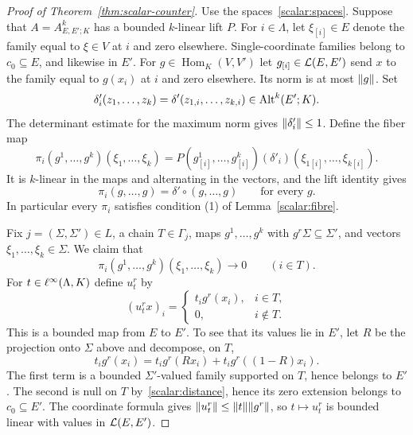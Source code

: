 \begin{proof}[Proof of Theorem~\ref{thm:scalar-counter}]
Use the spaces~\eqref{scalar:spaces}. Suppose that $A=A^k_{E,E';K}$ has a bounded $k$\nobreakdash-linear
lift $P$. For $i\in\Lambda$, let $\xi_{[i]}\in E$ denote the family equal to $\xi\in V$ at $i$ and zero
elsewhere. Single-coordinate families belong to $c_0\subseteq E$, and likewise in $E'$. For
$g\in\operatorname{Hom}_K(V,V')$ let $g_{[i]}\in\mathcal L(E,E')$ send $x$ to the family equal to $g(x_i)$ at
$i$ and zero elsewhere. Its norm is at most $\lVert g\rVert$. Set
\[
 \delta'_i(z_1,\dots,z_k)=\delta'(z_{1,i},\dots,z_{k,i})\in\operatorname{Alt}^k(E';K).
\]
The determinant estimate for the maximum norm gives $\lVert \delta'_i\rVert\le1$. Define the fiber map
\begin{equation}\label{scalar:fibre-map}
 \pi_i(g^1,\dots,g^k)(\xi_1,\dots,\xi_k)
 =P(g^1_{[i]},\dots,g^k_{[i]})(\delta'_i)
       (\xi_{1[i]},\dots,\xi_{k[i]}).
\end{equation}
It is $k$\nobreakdash-linear in the maps and alternating in the vectors, and the lift identity gives
\begin{equation}\label{scalar:fibre-diagonal}
 \pi_i(g,\dots,g)=\delta'\circ(g,\dots,g)
 \qquad\text{for every }g.
\end{equation}
In particular every $\pi_i$ satisfies condition (1) of Lemma~\ref{scalar:fibre}.

Fix $j=(\Sigma,\Sigma')\in L$, a chain $T\in\Gamma_j$, maps $g^1,\dots,g^k$ with
$g^r\Sigma\subseteq\Sigma'$, and vectors $\xi_1,\dots,\xi_k\in\Sigma$. We claim that
\begin{equation}\label{scalar:chain-decay}
 \pi_i(g^1,\dots,g^k)(\xi_1,\dots,\xi_k)\longrightarrow0
 \qquad(i\in T).
\end{equation}
For $t\in\ell^\infty(\Lambda,K)$ define $u^r_t$ by
\[
 (u^r_t x)_i=\begin{cases}t_i g^r(x_i),&i\in T,\\0,&i\notin T.\end{cases}
\]
This is a bounded map from $E$ to $E'$. To see that its values lie in $E'$, let $R$ be the projection
onto $\Sigma$ above and decompose, on $T$,
\[
 t_i g^r(x_i)=t_i g^r(Rx_i)+t_i g^r((1-R)x_i).
\]
The first term is a bounded $\Sigma'$\nobreakdash-valued family supported on $T$, hence belongs to $E'$.
The second is null on $T$ by~\eqref{scalar:distance}, hence its zero extension belongs to $c_0\subseteq E'$.
The coordinate formula gives $\lVert u^r_t\rVert\le\lVert t\rVert\lVert g^r\rVert$, so $t\mapsto u^r_t$ is bounded linear
with values in $\mathcal L(E,E')$.


\end{proof}
